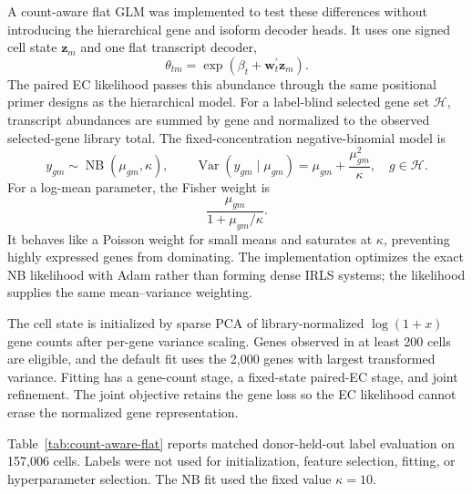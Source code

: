 \documentclass[11pt]{article}
\begin{document}
A count-aware flat GLM was implemented to test these differences without
introducing the hierarchical gene and isoform decoder heads. It uses one
signed cell state \(\bm z_m\) and one flat transcript decoder,
\[
  \theta_{tm}
  =
  \exp(\beta_t+\bm w_t^\prime\bm z_m).
\]
The paired EC likelihood passes this abundance through the same positional
primer designs as the hierarchical model. For a label-blind selected gene set
\(\mathcal H\), transcript abundances are summed by gene and normalized to
the observed selected-gene library total. The fixed-concentration
negative-binomial model is
\[
  y_{gm}\sim\operatorname{NB}(\mu_{gm},\kappa),
  \qquad
  \operatorname{Var}(y_{gm}\mid\mu_{gm})
  =
  \mu_{gm}+\frac{\mu_{gm}^2}{\kappa},
  \quad g\in\mathcal H.
\]
For a log-mean parameter, the Fisher weight is
\[
  \frac{\mu_{gm}}
       {1+\mu_{gm}/\kappa}.
\]
It behaves like a Poisson weight for small means and saturates at
\(\kappa\), preventing highly expressed genes from dominating. The
implementation optimizes the exact NB likelihood with Adam rather than
forming dense IRLS systems; the likelihood supplies the same mean--variance
weighting.

The cell state is initialized by sparse PCA of library-normalized
\(\log(1+x)\) gene counts after per-gene variance scaling. Genes observed in
at least 200 cells are eligible, and the default fit uses the 2,000 genes with
largest transformed variance. Fitting has a gene-count stage, a fixed-state
paired-EC stage, and joint refinement. The joint objective retains the gene
loss so the EC likelihood cannot erase the normalized gene representation.

Table~\ref{tab:count-aware-flat} reports matched donor-held-out label
evaluation on 157,006 cells. Labels were not used for initialization,
feature selection, fitting, or hyperparameter selection. The NB fit used the
fixed value \(\kappa=10\).
\end{document}
